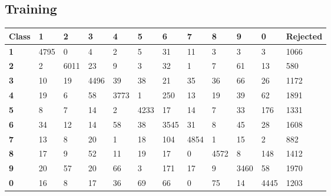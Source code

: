 \documentclass[
  a4paper,            %
  DIV=10,             %
  oneside,            %
  BCOR=5mm,           %
  parskip=half,       %
  numbers=noenddot,   %
  bibtotoc,           %
  listof=totoc        %
]{scrreprt}
\begin{document}
\subsection{Training}
\begin{center}
  \begin{tabular}{|p{1cm}|p{1cm}|p{1cm}|p{1cm}|p{1cm}|p{1cm}|p{1cm}|p{1cm}|p{1cm}|p{1cm}|p{1cm}|p{1.7cm}|}
    \hline
    \textbf{Class} & \textbf{1} & \textbf{2} & \textbf{3} & \textbf{4} & \textbf{5} & \textbf{6} & \textbf{7} & \textbf{8} & \textbf{9} & \textbf{0} & \textbf{Rejected} \\
    \hline
    \textbf{1} & 4795 & 0 & 4 & 2 & 5 & 31 & 11 & 3 & 3 & 3 & 1066 \\
    \hline
    \textbf{2} & 2 & 6011 & 23 & 9 & 3 & 32 & 1 & 7 & 61 & 13 & 580 \\
    \hline
    \textbf{3} & 10 & 19 & 4496 & 39 & 38 & 21 & 35 & 36 & 66 & 26 & 1172 \\
    \hline
    \textbf{4} & 19 & 6 & 58 & 3773 & 1 & 250 & 13 & 19 & 39 & 62 & 1891 \\
    \hline
    \textbf{5} & 8 & 7 & 14 & 2 & 4233 & 17 & 14 & 7 & 33 & 176 & 1331 \\
    \hline
    \textbf{6} & 34 & 12 & 14 & 58 & 38 & 3545 & 31 & 8 & 45 & 28 & 1608 \\
    \hline
    \textbf{7} & 13 & 8 & 20 & 1 & 18 & 104 & 4854 & 1 & 15 & 2 & 882 \\
    \hline
    \textbf{8} & 17 & 9 & 52 & 11 & 19 & 17 & 0 & 4572 & 8 & 148 & 1412 \\
    \hline
    \textbf{9} & 20 & 57 & 20 & 66 & 3 & 171 & 17 & 9 & 3460 & 58 & 1970 \\
    \hline
    \textbf{0} & 16 & 8 & 17 & 36 & 69 & 66 & 0 & 75 & 14 & 4445 & 1203 \\
    \hline
  \end{tabular}
\end{center}
\end{document}

